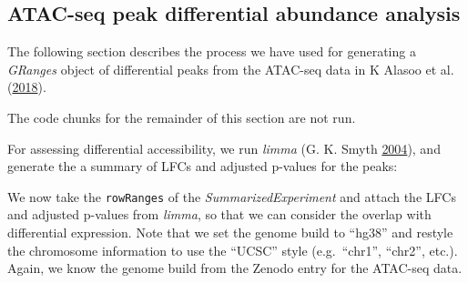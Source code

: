 \documentclass[
]{article}
\newenvironment{Shaded}{}{}
\newcommand{\DataTypeTok}[1]{\textcolor[rgb]{0.56,0.13,0.00}{#1}}
\newcommand{\KeywordTok}[1]{\textcolor[rgb]{0.00,0.44,0.13}{\textbf{#1}}}
\newcommand{\NormalTok}[1]{#1}
\newcommand{\OperatorTok}[1]{\textcolor[rgb]{0.40,0.40,0.40}{#1}}
\newcommand{\StringTok}[1]{\textcolor[rgb]{0.25,0.44,0.63}{#1}}
\begin{document}
\hypertarget{atac-seq-peak-differential-abundance-analysis}{%
\subsection{ATAC-seq peak differential abundance analysis}\label{atac-seq-peak-differential-abundance-analysis}}

The following section describes the process we have used for generating a
\emph{GRanges} object of differential peaks from the ATAC-seq data in K Alasoo et al. (\protect\hyperlink{ref-alasoo}{2018}).

The code chunks for the remainder of this section are not run.

For assessing differential accessibility, we run \emph{limma} (G. K. Smyth \protect\hyperlink{ref-Smyth2004}{2004}), and
generate the a summary of LFCs and adjusted p-values for the peaks:

\begin{Shaded}
\end{Shaded}

We now take the \texttt{rowRanges} of the \emph{SummarizedExperiment} and attach the LFCs
and adjusted p-values from \emph{limma}, so that we can consider the overlap with
differential expression. Note that we set the genome build to ``hg38'' and
restyle the chromosome information to use the ``UCSC'' style (e.g.~``chr1'',
``chr2'', etc.). Again, we know the genome build from the Zenodo entry for the
ATAC-seq data.
\end{document}
